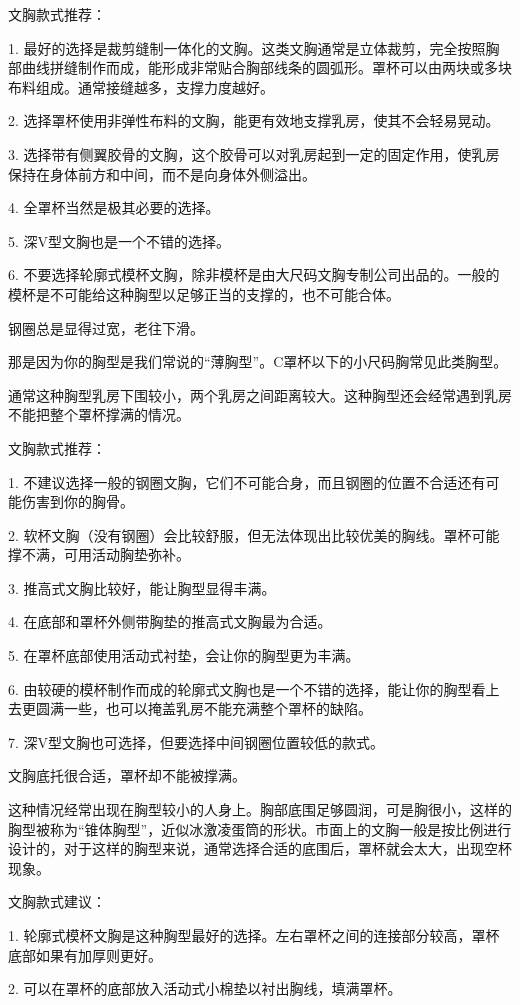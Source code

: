 \documentclass[12pt,UTF8]{ctexbook}
\begin{document}
文胸款式推荐：

1. 最好的选择是裁剪缝制一体化的文胸。这类文胸通常是立体裁剪，完全按照胸部曲线拼缝制作而成，能形成非常贴合胸部线条的圆弧形。罩杯可以由两块或多块布料组成。通常接缝越多，支撑力度越好。

2. 选择罩杯使用非弹性布料的文胸，能更有效地支撑乳房，使其不会轻易晃动。

3. 选择带有侧翼胶骨的文胸，这个胶骨可以对乳房起到一定的固定作用，使乳房保持在身体前方和中间，而不是向身体外侧溢出。

4. 全罩杯当然是极其必要的选择。

5. 深V型文胸也是一个不错的选择。

6. 不要选择轮廓式模杯文胸，除非模杯是由大尺码文胸专制公司出品的。一般的模杯是不可能给这种胸型以足够正当的支撑的，也不可能合体。


钢圈总是显得过宽，老往下滑。

那是因为你的胸型是我们常说的“薄胸型”。C罩杯以下的小尺码胸常见此类胸型。

通常这种胸型乳房下围较小，两个乳房之间距离较大。这种胸型还会经常遇到乳房不能把整个罩杯撑满的情况。


文胸款式推荐：

1. 不建议选择一般的钢圈文胸，它们不可能合身，而且钢圈的位置不合适还有可能伤害到你的胸骨。

2. 软杯文胸（没有钢圈）会比较舒服，但无法体现出比较优美的胸线。罩杯可能撑不满，可用活动胸垫弥补。

3. 推高式文胸比较好，能让胸型显得丰满。

4. 在底部和罩杯外侧带胸垫的推高式文胸最为合适。

5. 在罩杯底部使用活动式衬垫，会让你的胸型更为丰满。

6. 由较硬的模杯制作而成的轮廓式文胸也是一个不错的选择，能让你的胸型看上去更圆满一些，也可以掩盖乳房不能充满整个罩杯的缺陷。

7. 深V型文胸也可选择，但要选择中间钢圈位置较低的款式。


文胸底托很合适，罩杯却不能被撑满。

这种情况经常出现在胸型较小的人身上。胸部底围足够圆润，可是胸很小，这样的胸型被称为“锥体胸型”，近似冰激凌蛋筒的形状。市面上的文胸一般是按比例进行设计的，对于这样的胸型来说，通常选择合适的底围后，罩杯就会太大，出现空杯现象。


文胸款式建议：

1. 轮廓式模杯文胸是这种胸型最好的选择。左右罩杯之间的连接部分较高，罩杯底部如果有加厚则更好。

2. 可以在罩杯的底部放入活动式小棉垫以衬出胸线，填满罩杯。
\end{document}
